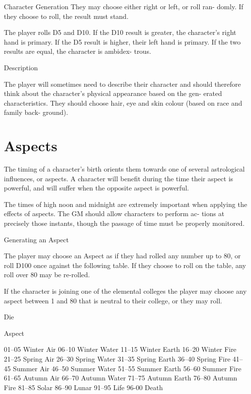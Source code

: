 \begin{Chapter}{Character Generation}
They  may  choose  either  right  or  left,  or  roll  ran-
domly. If they choose to roll, the result must stand. 

The  player  rolls  D5  and  D10.  If  the  D10  result  is 
greater, the character’s right hand is primary. If the 
D5 result is higher, their left hand is primary. If the 
two  results  are  equal,  the  character  is  ambidex-
trous. 

Description 

The  player  will  sometimes  need  to  describe  their 
character  and  should  therefore  think  about  the 
character’s  physical  appearance  based  on  the  gen-
erated characteristics. They should choose hair, eye 
and  skin  colour  (based  on  race  and  family  back-
ground). 

\section{Aspects}
\label{aspects}

The timing of a character’s birth orients them towards one of several
astrological influences, or aspects.  A character will benefit during
the time their aspect is powerful, and will suffer when the opposite
aspect is powerful.

The times of high noon and midnight are extremely 
important  when  applying  the  effects  of  aspects. 
The  GM  should  allow  characters  to  perform  ac-
tions at precisely those instants, though the passage 
of time must be properly monitored. 

Generating an Aspect 

The  player  may  choose  an  Aspect  as  if  they  had 
rolled  any  number  up  to  80,  or  roll  D100  once 
against  the  following  table.  If  they  choose  to  roll 
on the table, any roll over 80 may be re-rolled. 

If  the  character  is  joining  one  of  the  elemental 
colleges the player may choose any aspect between 
1 and 80 that is neutral to their college, or they may 
roll. 

Die  

Aspect 

01–05   Winter Air 
06–10   Winter Water 
11–15   Winter Earth 
16–20   Winter Fire 
21–25   Spring Air 
26–30   Spring Water 
31–35   Spring Earth 
36–40   Spring Fire 
41–45   Summer Air 
46–50   Summer Water 
51–55   Summer Earth 
56–60   Summer Fire 
61–65   Autumn Air 
66–70   Autumn Water 
71–75   Autumn Earth 
76–80   Autumn Fire 
81–85   Solar 
86–90   Lunar 
91–95   Life 
96-00   Death 


\end{Chapter}
